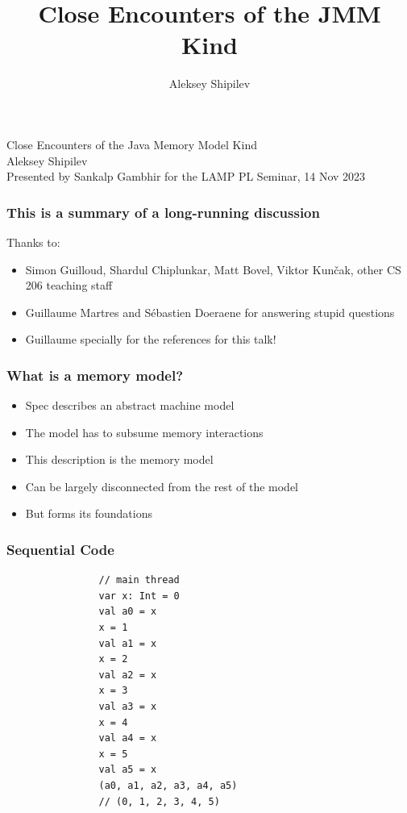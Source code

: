 \documentclass[aspectratio=1610, xcolor={dvipsnames}]{beamer}
\title{Close Encounters of the JMM Kind}
\author{Aleksey Shipilev}
\begin{document}
\begin{frame}
    \centering
    {\Large Close Encounters of the Java Memory Model Kind} \\
    {\large Aleksey Shipilev}\\ \vspace{3em}
    Presented by Sankalp Gambhir for the LAMP PL Seminar, 14 Nov 2023
\end{frame}

\begin{frame}
    \frametitle{This is a summary of a long-running discussion}

    Thanks to:

    \begin{itemize}
        \item Simon Guilloud, Shardul Chiplunkar, Matt Bovel, Viktor Kun\v cak, other CS 206 teaching staff
        \item Guillaume Martres and S\'ebastien Doeraene for answering stupid questions
        \item Guillaume specially for the references for this talk!
    \end{itemize}
    

\end{frame}

\begin{frame}
    \frametitle{What is a memory model?}

    \begin{itemize}[<+->]
        \item Spec describes an abstract machine model
        \item The model has to subsume memory interactions
        \item This description is the memory model
        \item Can be largely disconnected from the rest of the model
        \item But forms its foundations
    \end{itemize}

\end{frame}


\begin{frame}[fragile]
    \frametitle{Sequential Code}

    \begin{lstlisting}
                // main thread
                var x: Int = 0
                val a0 = x
                x = 1
                val a1 = x
                x = 2
                val a2 = x
                x = 3
                val a3 = x
                x = 4
                val a4 = x
                x = 5
                val a5 = x
                (a0, a1, a2, a3, a4, a5)
                // (0, 1, 2, 3, 4, 5)
    \end{lstlisting}

\end{frame}
\end{document}
